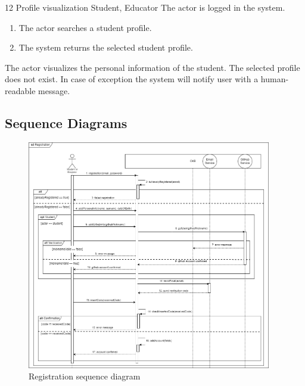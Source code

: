 \clearpage

\usecase
{12}
{Profile visualization} %
{Student, Educator} %
{The actor is logged in the system.} %
{ %
    \begin{enumerate}
        \item The actor searches a student profile.
        \item The system returns the selected student profile.
    \end{enumerate}
}
{The actor visualizes the personal information of the student.} %
{ %
 The selected profile does not exist. 
}
{ %
In case of exception the system will notify user with a human-readable message.
}

\subsection{Sequence Diagrams}
\begin{figure}[H]
    \centering
    \includegraphics[width=0.95\textwidth]{images/seq_diagrams/Registration.png}
    \caption{Registration sequence diagram}
\end{figure}
\clearpage

